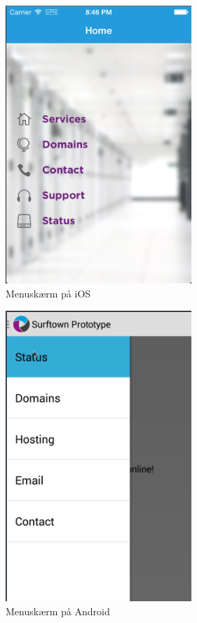 \documentclass[12pt]{article}
\begin{document}
\newpage
\begin{figure}[h]
	\centering
	\includegraphics[width=7cm]{ios/menu.png}
	\caption{Menuskærm på iOS}
\end{figure}
\newpage
\begin{figure}[h]
	\centering
	\includegraphics[width=7cm]{screenshots/menu.png}
	\caption{Menuskærm på Android}
\end{figure}
\newpage
\end{document}
